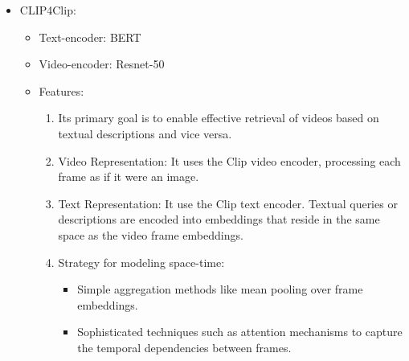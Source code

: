 \begin{itemize}
\item CLIP4Clip:
\begin{itemize}
\item Text-encoder: BERT
\item Video-encoder: Resnet-50
\item Features:
\begin{enumerate}
\item Its primary goal is to enable effective retrieval of videos based on textual descriptions and vice versa. 
\item Video Representation: It uses the Clip video encoder, processing each frame as if it were an image.
\item Text Representation: It use the Clip text encoder. Textual queries or descriptions are encoded into embeddings that reside in the same space as the video frame embeddings.
\item Strategy for modeling space-time:
\begin{itemize}
\item Simple aggregation methods like mean pooling over frame embeddings.
\item Sophisticated techniques such as attention mechanisms to capture the temporal dependencies between frames.
\end{itemize}
\end{enumerate}
\end{itemize}
\end{itemize}

